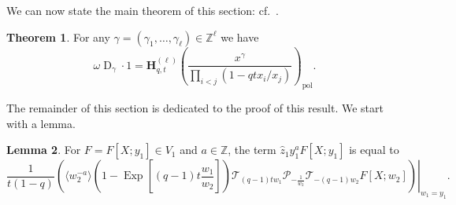 \documentclass[reqno]{amsart}
\theoremstyle{plain}
\theoremstyle{definition}
\newtheorem{theorem}{Theorem}[section]
\newtheorem{lemma}[theorem]{Lemma}
\theoremstyle{remark}
\DeclareMathOperator{\D}{D}
\DeclareMathOperator{\Exp}{Exp}
\newcommand{\z}{\widehat{z}}
\newcommand{\<}{\langle}
\renewcommand{\>}{\rangle}
\begin{document}
We can now state the main theorem of this section: cf.\ \cite[Corollary~3.7.2]{BHMPS2023ShuffleAnyLine}.
\begin{theorem}
    \label{thm:Don1}
    For any $\gamma=(\gamma_1,\dots,\gamma_{\ell})\in \mathbb{Z}^{\ell}$ we have
    \[\omega \D_\gamma \cdot 1 = \mathbf{H}_{q,t}^{(\ell)}\left(\frac{x^\gamma}{\prod_{i<j}(1-qt x_i/x_j)}\right)_{\mathrm{pol}}.\]
\end{theorem}

The remainder of this section is dedicated to the proof of this result. We start with a lemma.

\begin{lemma}
    \label{lemma:z1y1a}
    For $F = F[X;y_1]\in V_1$ and $a \in \mathbb{Z}$, the term $\z_1 y_1^a F[X;y_1]$ is equal to
    \[ \left. \frac{1}{t(1-q)}\left(\langle w_2^{-a} \rangle \left(1-\Exp\left[(q-1)t\frac{w_1}{w_2}\right] \right) \mathcal{T}_{(q-1)tw_1}\mathcal{P}_{-\frac{1}{w_2}} \mathcal{T}_{-(q-1)w_2}F[X;w_2]\right)\right\rvert_{w_1=y_1}. \]
\end{lemma}
\end{document}
